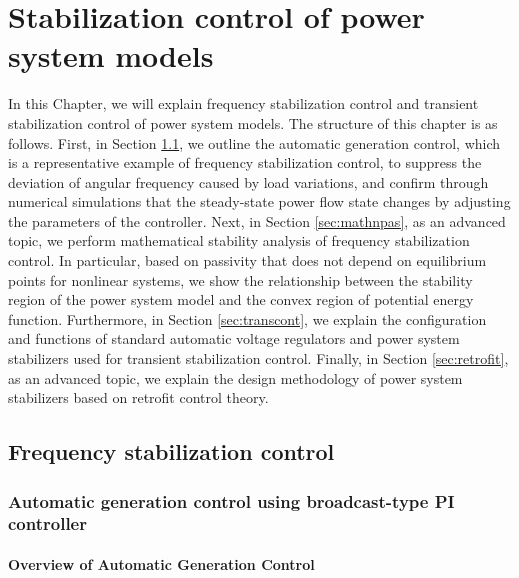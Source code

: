 \documentclass[graybox, envcountchap]{svmult}
\begin{document}
\chapter{Stabilization control of power system models}\label{ch:stabcont}
In this Chapter, we will explain frequency stabilization control and transient
stabilization control of power system models. The structure of this chapter is
as follows. First, in Section \ref{sec:agcover}, we outline the automatic
generation control, which is a representative example of frequency stabilization
control, to suppress the deviation of angular frequency caused by load
variations, and confirm through numerical simulations that the steady-state
power flow state changes by adjusting the parameters of the controller. Next, in
Section \ref{sec:mathnpas}, as an advanced topic, we perform mathematical
stability analysis of frequency stabilization control. In particular, based on
passivity that does not depend on equilibrium points for nonlinear systems, we
show the relationship between the stability region of the power system model and
the convex region of potential energy function. Furthermore, in Section
\ref{sec:transcont}, we explain the configuration and functions of standard
automatic voltage regulators and power system stabilizers used for transient
stabilization control. Finally, in Section \ref{sec:retrofit}, as an advanced
topic, we explain the design methodology of power system stabilizers based on
retrofit control theory.

\section{Frequency stabilization control}\label{sec:agcover}
\subsection{Automatic generation control using broadcast-type PI controller}\label{sec:broadPI}

\smallskip
\subsubsection{Overview of Automatic Generation Control}
\end{document}
